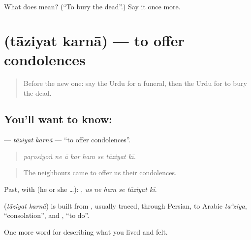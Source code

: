 \begin{tcolorbox}[breakable,colback=teal!4,colframe=teal!35!black,title={Before you move on}]
What does  mean? (\textquotedblleft{}To bury the dead\textquotedblright{}.) Say it once more.
\end{tcolorbox}
\section[\texorpdfstring{\ur{تعزیت} \ur{کرنا} (tāziyat karnā)}{تعزیت کرنا (tāziyat karnā)}]{  (tāziyat karnā) — to offer condolences}

\label{lesson:UR-C493-taziyat-karna}



\begin{quote}
Before the new one: say the Urdu for a funeral, then the Urdu for to bury the dead.
\end{quote}

\subsection*{You'll want to know:  }
\textbf{ } — \emph{tāziyat karnā} — \textquotedblleft{}to offer condolences\textquotedblright{}.

\begin{quote}
       
\end{quote}

\begin{quote}
\emph{paṛosiyoṅ ne ā kar ham se tāziyat kī.}
\end{quote}

\begin{quote}
The neighbours came to offer us their condolences.
\end{quote}

Past, with  (he or she …):      , \emph{us ne ham se tāziyat kī}.

\begin{cousinweb}
\textbf{ } (\emph{tāziyat karnā}) is built from \textbf{}, usually traced, through Persian, to Arabic \emph{taʿziya}, \textquotedblleft{}consolation\textquotedblright{}, and \textbf{}, \textquotedblleft{}to do\textquotedblright{}.
\end{cousinweb}

\begin{grammarlens}[title={What you've built}]
One more word for describing what you lived and felt.
\end{grammarlens}

